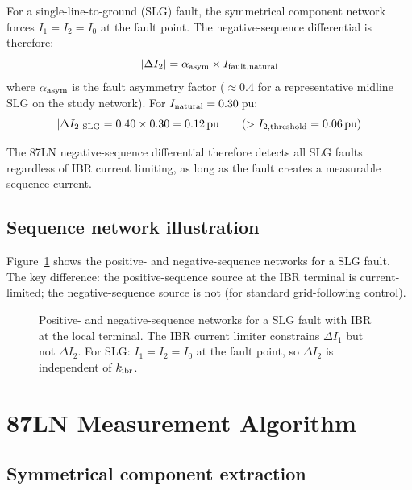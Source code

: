 \documentclass[11pt, a4paper]{article}
\begin{document}
For a single-line-to-ground (SLG) fault, the symmetrical component
network forces $I_1 = I_2 = I_0$ at the fault point.  The
negative-sequence differential is therefore:
\begin{equation}
  |\Delta I_2| = \alpha_{\rm asym} \times I_{\rm fault,natural}
  \label{eq:I2}
\end{equation}
where $\alpha_{\rm asym}$ is the fault asymmetry factor ($\approx 0.4$
for a representative midline SLG on the study network).  For
$I_{\rm natural} = 0.30$\,pu:
\begin{equation}
  |\Delta I_2|_{\rm SLG} = 0.40 \times 0.30 = 0.12\,\text{pu}
  \qquad (> I_{2,\rm threshold} = 0.06\,\text{pu})
\end{equation}

The 87LN negative-sequence differential therefore detects all SLG faults
regardless of IBR current limiting, as long as the fault creates a
measurable sequence current.

\subsection{Sequence network illustration}

Figure~\ref{fig:seqnet} shows the positive- and negative-sequence networks
for a SLG fault.  The key difference: the positive-sequence source at the
IBR terminal is current-limited; the negative-sequence source is not (for
standard grid-following control).

\begin{figure}[h]
  \centering
  \resizebox{\textwidth}{!}{}
  \caption{Positive- and negative-sequence networks for a SLG fault with
           IBR at the local terminal.  The IBR current limiter constrains
           $\Delta I_1$ but not $\Delta I_2$.  For SLG: $I_1 = I_2 = I_0$
           at the fault point, so $\Delta I_2$ is independent of
           $k_{\rm ibr}$.}
  \label{fig:seqnet}
\end{figure}


\section{87LN Measurement Algorithm}
\label{sec:algorithm}

\subsection{Symmetrical component extraction}
\end{document}
